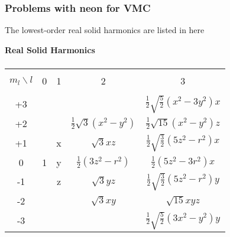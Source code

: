 \frame
{
  \frametitle{Problems with neon for VMC}
\begin{small}
{\scriptsize
 The lowest-order real solid harmonics are
listed in here
\begin{center} {\large \bf Real Solid Harmonics} \\ 
$\phantom{a}$ \\
\begin{tabular}{ccccc}
\hline\\ 
$m_l\backslash l$ & \phantom{AA}0\phantom{AA}
& \phantom{AA}1\phantom{AA} & \phantom{AA}2\phantom{AA} &
\phantom{AA}3\phantom{AA} \\ 
\hline\\ 
+3& & &
&$\frac{1}{2}\sqrt{\frac{5}{2}}(x^2-3y^2)x$ \\ [7pt] 
+2& & &$\frac{1}{2}\sqrt{3}(x^2-y^2)$&$\frac{1}{2}\sqrt{15}(x^2-y^2)z$
\\ [7pt] 
+1& &x&$\sqrt{3}xz$
&$\frac{1}{2}\sqrt{\frac{3}{2}}(5z^2-r^2)x$ \\ [7pt] 
0&1&y&$\frac{1}{2}(3z^2-r^2)$       &$\frac{1}{2}(5z^2-3r^2)x$ \\
 [7pt] 
-1& &z&$\sqrt{3}yz$
&$\frac{1}{2}\sqrt{\frac{3}{2}}(5z^2-r^2)y$ \\ [7pt] 
-2& & &$\sqrt{3}xy$                  &$\sqrt{15}xyz$ \\ [7pt] 
-3& & &
&$\frac{1}{2}\sqrt{\frac{5}{2}}(3x^2-y^2)y$ \\ [7pt] 
\hline
\end{tabular} 
\end{center}

}
\end{small}
}






